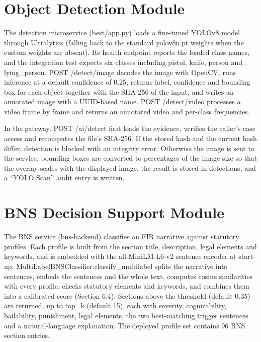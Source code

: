 \documentclass[12pt,a4paper,oneside]{report}
\newcommand{\code}[1]{{\small\ttfamily #1}}
\begin{document}
\section{Object Detection Module}
The detection microservice (\code{best/\allowbreak{}app.py}) loads a fine-tuned YOLOv8 model through Ultralytics (falling back to the standard \code{yolov8n.pt} weights when the custom weights are absent). Its health endpoint reports the loaded class names, and the integration test expects six classes including pistol, knife, person and lying\_person. \code{POST /\allowbreak{}detect/\allowbreak{}image} decodes the image with OpenCV, runs inference at a default confidence of 0.25, returns label, confidence and bounding box for each object together with the SHA-256 of the input, and writes an annotated image with a UUID-based name. \code{POST /\allowbreak{}detect/\allowbreak{}video} processes a video frame by frame and returns an annotated video and per-class frequencies.

In the gateway, \code{POST /\allowbreak{}ai/\allowbreak{}detect} first loads the evidence, verifies the caller's case access and recomputes the file's SHA-256. If the stored hash and the current hash differ, detection is blocked with an integrity error. Otherwise the image is sent to the service, bounding boxes are converted to percentages of the image size so that the overlay scales with the displayed image, the result is stored in \code{detections}, and a ``YOLO Scan'' audit entry is written.

\section{BNS Decision Support Module}
The BNS service (\code{bns-backend}) classifies an FIR narrative against statutory profiles. Each profile is built from the section title, description, legal elements and keywords, and is embedded with the \code{all-MiniLM-L6-v2} sentence encoder at start-up. \code{MultiLabelBNSClassifier.classify\_\allowbreak{}multilabel} splits the narrative into sentences, embeds the sentences and the whole text, computes cosine similarities with every profile, checks statutory elements and keywords, and combines them into a calibrated score (Section 6.4). Sections above the threshold (default 0.35) are returned, up to \code{top\_\allowbreak{}k} (default 15), each with severity, cognizability, bailability, punishment, legal elements, the two best-matching trigger sentences and a natural-language explanation. The deployed profile set contains 96 BNS section entries.
\end{document}
